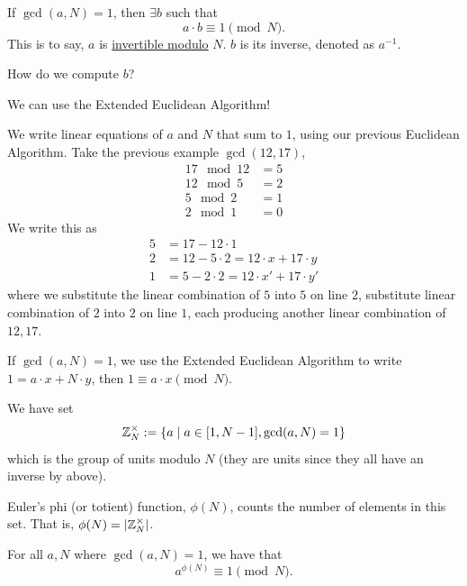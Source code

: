 \begin{theorem}
    If $\gcd(a,N) = 1$, then $\exists b$ such that
    \[a\cdot b \equiv 1\pmod{N}.\]
    This is to say, $a$ is \ul{invertible modulo} $N$. $b$ is its inverse, denoted as $a^{-1}$.
\end{theorem}
\begin{ques*}
    How do we compute $b$?
\end{ques*}
We can use the Extended Euclidean Algorithm!
\begin{example*}
    We write linear equations of $a$ and $N$ that sum to $1$, using our previous Euclidean Algorithm. Take the previous example $\gcd(12, 17)$,
    \begin{align*}
        17\mod{12} & = 5 \\
        12 \mod{5} & = 2 \\
        5\mod{2}   & = 1 \\
        2\mod{1}   & = 0
    \end{align*}
    We write this as
    \begin{align*}
        5 & = 17 - 12\cdot 1                         \\
        2 & = 12 - 5\cdot 2 = 12\cdot x + 17\cdot y  \\
        1 & = 5 - 2\cdot 2 = 12\cdot x' + 17\cdot y'
    \end{align*}
    where we substitute the linear combination of $5$ into $5$ on line $2$, substitute linear combination of $2$ into $2$ on line $1$, each producing another linear combination of $12, 17$.

    If $\gcd(a, N) = 1$, we use the Extended Euclidean Algorithm to write $1 = a\cdot x + N\cdot y$, then $1\equiv a\cdot x\pmod{N}$.
\end{example*}

\begin{definition}
    We have set
    \[\mathbb Z_N^\times:= \left\{ a\mid a\in [1, N-1], \gcd(a, N) = 1 \right\}\]
    which is the group of units modulo $N$ (they are units since they all have an inverse by above).
\end{definition}
\begin{definition}
    Euler's phi (or totient) function, $\phi(N)$, counts the number of elements in this set. That is, $\phi(N) =  |\mathbb Z_N^\times|$.
\end{definition}
\begin{theorem}
    For all $a, N$ where $\gcd(a, N) = 1$, we have that \[a^{\phi(N)} \equiv 1\pmod{N}.\]
\end{theorem}

